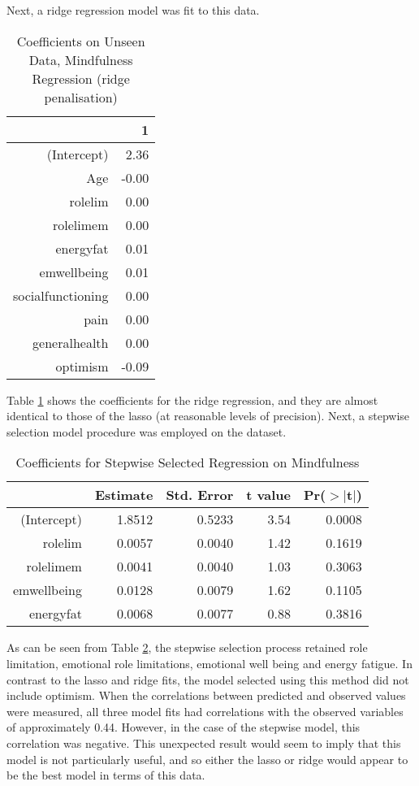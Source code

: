 \documentclass{article}
\begin{document}
Next, a ridge regression model was fit to this data. 

\begin{table}[ht]
\centering
\begin{tabular}{rr}
  \hline
 & 1 \\ 
  \hline
(Intercept) & 2.36 \\ 
  Age & -0.00 \\ 
  rolelim & 0.00 \\ 
  rolelimem & 0.00 \\ 
  energyfat & 0.01 \\ 
  emwellbeing & 0.01 \\ 
  socialfunctioning & 0.00 \\ 
  pain & 0.00 \\ 
  generalhealth & 0.00 \\ 
  optimism & -0.09 \\ 
   \hline
\end{tabular}
\caption{Coefficients on Unseen Data, Mindfulness Regression (ridge penalisation)} 
\label{tab:hom1mindridge}
\end{table}
Table \ref{tab:hom1mindridge} shows the coefficients for the ridge regression, and they are almost identical to those of the lasso (at reasonable levels of precision). Next, a stepwise selection model procedure was employed on the dataset. 


\begin{table}[ht]
\centering
\begin{tabular}{rrrrr}
  \hline
 & Estimate & Std. Error & t value & Pr($>$$|$t$|$) \\ 
  \hline
(Intercept) & 1.8512 & 0.5233 & 3.54 & 0.0008 \\ 
  rolelim & 0.0057 & 0.0040 & 1.42 & 0.1619 \\ 
  rolelimem & 0.0041 & 0.0040 & 1.03 & 0.3063 \\ 
  emwellbeing & 0.0128 & 0.0079 & 1.62 & 0.1105 \\ 
  energyfat & 0.0068 & 0.0077 & 0.88 & 0.3816 \\ 
   \hline
\end{tabular}
\caption{Coefficients for Stepwise Selected Regression on Mindfulness} 
\label{tab:hom1mindsteptest}
\end{table}
As can be seen from Table \ref{tab:hom1mindsteptest}, the stepwise selection process retained role limitation, emotional role limitations, emotional well being and energy fatigue. In contrast to the lasso and ridge fits, the model selected using this method did not include optimism. When the correlations between predicted and observed values were measured, all three model fits had correlations with the observed variables of approximately 0.44. However, in the case of the stepwise model, this correlation was negative. This unexpected result would seem to imply that this model is not particularly useful, and so either the lasso or ridge would appear to be the best model in terms of this data. 
\end{document}
